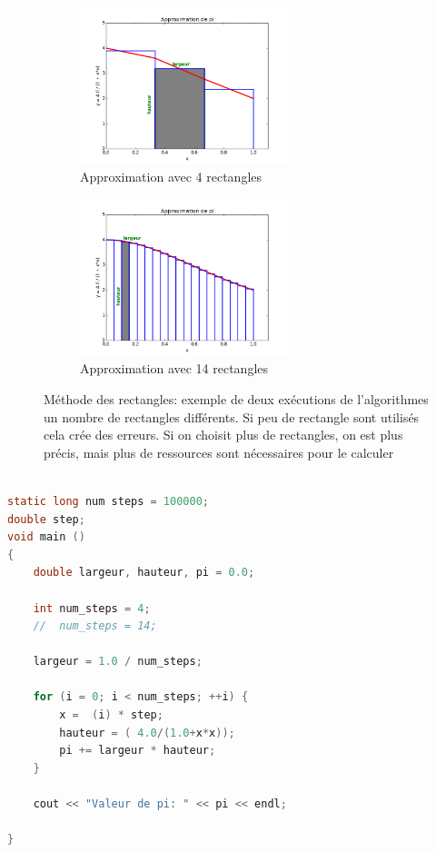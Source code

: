 \begin{figure}[t!]
    \centering
    \begin{subfigure}[t]{0.5\textwidth}
        \label{pic_pi_1}
        \centering
        \includegraphics[height=1.8in]{images/Chapitre1/pic_pi_rect_1.png}
        \caption{Approximation avec 4 rectangles}
    \end{subfigure}%
\begin{subfigure}[t]{0.5\textwidth}
        \label{pic_pi_2}
        \centering
        \includegraphics[height=1.8in]{images/Chapitre1/pic_pi_rect_2.png}
        \caption{Approximation avec 14 rectangles}
    \end{subfigure}
    \caption{Méthode des rectangles: exemple de deux exécutions de l'algorithmes un nombre de rectangles différents. Si peu de rectangle sont utilisés cela crée des erreurs. Si on choisit plus de rectangles, on est plus précis, mais plus de ressources sont nécessaires pour le calculer }
    \label{pic_pi_rect}
\end{figure}

\begin{lstlisting}[language=C, caption=Implémentions de l'algorithme de calcul d'intégrale par la méthode des rectangles, float,floatplacement=H]

static long num steps = 100000; 
double step;
void main ()
{
    double largeur, hauteur, pi = 0.0;

    int num_steps = 4;
    //  num_steps = 14;

    largeur = 1.0 / num_steps;

    for (i = 0; i < num_steps; ++i) {
        x =  (i) * step;
        hauteur = ( 4.0/(1.0+x*x));
        pi += largeur * hauteur;
    }
    
    cout << "Valeur de pi: " << pi << endl;

}
\end{lstlisting}




